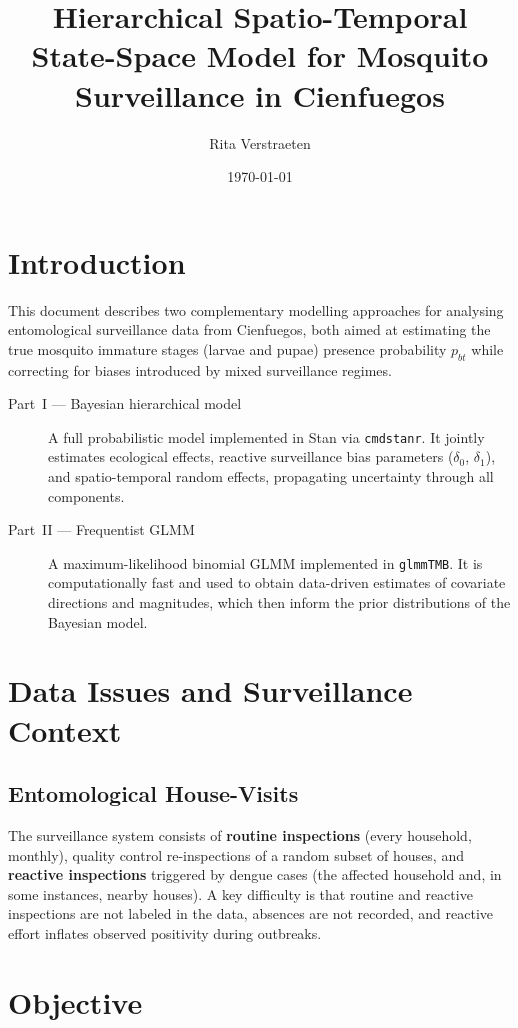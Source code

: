 \documentclass[12pt,a4paper]{article}
\title{Hierarchical Spatio-Temporal State-Space Model for Mosquito Surveillance in Cienfuegos}
\author{Rita Verstraeten}
\date{\today}
\begin{document}
\maketitle

\section{Introduction}

This document describes two complementary modelling approaches for analysing entomological surveillance data from Cienfuegos, both aimed at estimating the true mosquito immature stages (larvae and pupae) presence probability $p_{bt}$ while correcting for biases introduced by mixed surveillance regimes.

\begin{description}
\item[Part~I --- Bayesian hierarchical model] A full probabilistic model implemented in Stan via \texttt{cmdstanr}. It jointly estimates ecological effects, reactive surveillance bias parameters ($\delta_0$, $\delta_1$), and spatio-temporal random effects, propagating uncertainty through all components.
\item[Part~II --- Frequentist GLMM] A maximum-likelihood binomial GLMM implemented in \texttt{glmmTMB}. It is computationally fast and used to obtain data-driven estimates of covariate directions and magnitudes, which then inform the prior distributions of the Bayesian model.
\end{description}

\section{Data Issues and Surveillance Context}

\subsection{Entomological House-Visits}

The surveillance system consists of \textbf{routine inspections} (every household, monthly), quality control re-inspections of a random subset of houses, and \textbf{reactive inspections} triggered by dengue cases (the affected household and, in some instances, nearby houses). A key difficulty is that routine and reactive inspections are not labeled in the data, absences are not recorded, and reactive effort inflates observed positivity during outbreaks.

\section{Objective}
\end{document}
